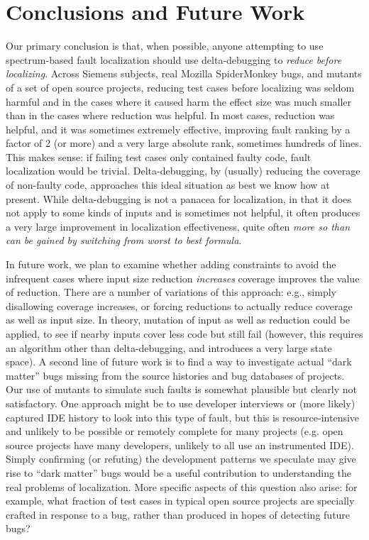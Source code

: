 \section{Conclusions and Future Work}

Our primary conclusion is that, when possible, anyone attempting to
use spectrum-based fault localization should use delta-debugging to
\emph{reduce before localizing}.  Across Siemens subjects, real
Mozilla SpiderMonkey bugs, and mutants of a set of open source
projects, reducing test cases before localizing was seldom harmful and
in the cases where it caused harm the effect size was much smaller
than in the cases where reduction was helpful.  In most cases,
reduction was helpful, and it was sometimes extremely effective,
improving fault ranking by a factor of 2 (or more) and a very large
absolute rank, sometimes hundreds of lines. This makes sense: if
failing test cases only contained faulty code, fault localization
would be trivial.  Delta-debugging, by (usually) reducing the coverage
of non-faulty code, approaches this ideal situation as best we know
how at present.  While delta-debugging is not a panacea for
localization, in that it does not apply to some kinds of inputs and is
sometimes not helpful, it often produces a very large improvement in
localization effectiveness, quite often \emph{more so than can be
gained by switching from worst to best formula}.

In future work, we plan to examine whether adding constraints to avoid
the infrequent cases where input size reduction \emph{increases}
coverage improves the value of reduction.  There are a number of
variations of this approach: e.g., simply disallowing coverage
increases, or forcing reductions to actually reduce coverage as well
as input size.  In theory, mutation of input as well as reduction
could be applied, to see if nearby inputs cover less code but still
fail (however, this requires an algorithm other than delta-debugging,
and introduces a very large state space).  A second line of future
work is to find a way to investigate actual ``dark matter'' bugs
missing from the source histories and bug databases of projects.  Our
use of mutants to simulate such faults is somewhat plausible but
clearly not satisfactory.  One approach might be to use developer
interviews or (more likely) captured IDE history \cite{Dangerous} to
look into this type of fault, but this is resource-intensive and
unlikely to be possible or remotely complete for many projects
(e.g. open source projects have many developers, unlikely to all use
an instrumented IDE).  Simply confirming (or refuting) the development
patterns we speculate may give rise to ``dark matter'' bugs would be a
useful contribution to understanding the real problems of
localization.  More specific aspects of this question also arise: for
example, what fraction of test cases in typical open source projects
are specially crafted in response to a bug, rather than produced in
hopes of detecting future bugs?

